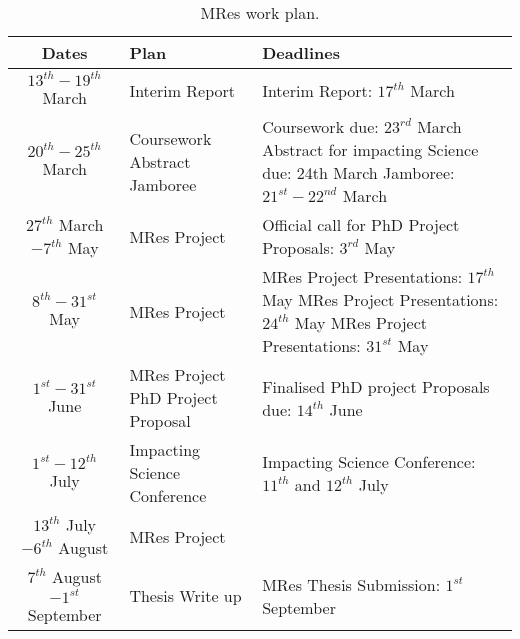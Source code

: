 \documentclass[a4paper]{article}
\begin{document}
\begin{table}
\begin{tabular}{|c|p{4cm}|p{7cm}|}
\hline
\textbf{Dates} & \textbf{Plan} & \textbf{Deadlines}\\
\hline
\hline
$13^{th} - 19^{th} $ March & Interim Report & Interim Report: $17^{th}$ March\\
\hline
$20^{th} -25^{th}$ March & Coursework \newline Abstract \newline \newline Jamboree & Coursework due: $23^{rd}$ March \newline Abstract for impacting Science due: 24th March \newline Jamboree: $21^{st} - 22^{nd}$ March\\
\hline
$27^{th}$ March  $- 7^{th}$ May & MRes Project & Official call for PhD Project Proposals: $3^{rd}$ May \\
\hline
$8^{th}-31^{st}$ May & MRes Project &  MRes Project Presentations: $17^{th}$ May \newline MRes Project Presentations: $24^{th}$ May \newline MRes Project Presentations: $31^{st}$ May\\
\hline
$1^{st}-31^{st}$ June  & MRes Project \newline PhD Project Proposal & Finalised PhD project Proposals due: $14^{th}$ June \\
\hline
$1^{st} - 12^{th}$ July & Impacting Science Conference & Impacting Science Conference: $11^{th}$ and $12^{th}$ July \\
\hline
$13^{th}$ July $-6^{th}$ August & MRes Project &  \\
\hline
$7^{th}$ August $-1^{st}$ September  & Thesis Write up & MRes Thesis Submission: $1^{st}$ September \\
\hline
\end{tabular}
\caption{MRes work plan.}
\label{tab:plan}
\end{table}

\clearpage


\end{document}

